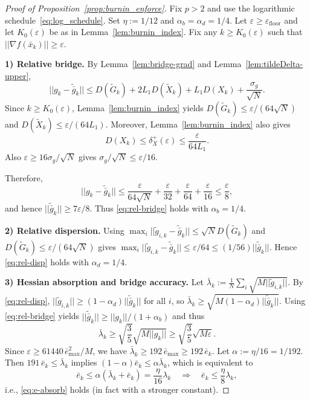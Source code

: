 \documentclass[11pt,a4paper]{article}
\def\norm#1{||#1||}%
\newcommand{\norm}[1]{\left\|#1\right\|}
\begin{document}
	\begin{proof}[Proof of Proposition~\ref{prop:burnin_enforce}]
		Fix $p>2$ and use the logarithmic schedule~\eqref{eq:log_schedule}.
		Set $\eta:=1/12$ and $\alpha_b=\alpha_d=1/4$.
		Let $\varepsilon\ge \varepsilon_{\mathrm{floor}}$ and let $K_0(\varepsilon)$ be as in Lemma~\ref{lem:burnin_index}.
		Fix any $k\ge K_0(\varepsilon)$ such that $\norm{\nabla f(\bar x_k)}\ge \varepsilon$.
		
		\medskip
		\noindent\textbf{1) Relative bridge.}
		By Lemma~\ref{lem:bridge-grad} and Lemma~\ref{lem:tildeDelta-upper},
		\[
		\norm{g_k-\tilde{\bar g}_k}
		\le D(\tilde G_k)+2L_1D(\tilde X_k)+L_1D(X_k)+\frac{\sigma_g}{\sqrt N}.
		\]
		Since $k\ge K_0(\varepsilon)$, Lemma~\ref{lem:burnin_index} yields $D(\tilde G_k)\le \varepsilon/(64\sqrt N)$ and $D(\tilde X_k)\le \varepsilon/(64L_1)$. Moreover, Lemma~\ref{lem:burnin_index} also gives
		\[
		D(X_k)\le \delta_X^{+}(\varepsilon)\le \frac{\varepsilon}{64L_1}.
		\]
		Also $\varepsilon\ge 16\sigma_g/\sqrt N$ gives $\sigma_g/\sqrt N\le \varepsilon/16$.
		
		Therefore,
		\[
		\norm{g_k-\tilde{\bar g}_k}
		\le \frac{\varepsilon}{64\sqrt N}+\frac{\varepsilon}{32}+\frac{\varepsilon}{64}+\frac{\varepsilon}{16}
		\le \frac{\varepsilon}{8},
		\]
		and hence $\norm{\tilde{\bar g}_k}\ge 7\varepsilon/8$. Thus \eqref{eq:rel-bridge} holds with $\alpha_b=1/4$.
		
		\medskip
		\noindent\textbf{2) Relative dispersion.}
		Using $\max_i\norm{\tilde g_{i,k}-\tilde{\bar g}_k}\le \sqrt N D(\tilde G_k)$ and $D(\tilde G_k)\le \varepsilon/(64\sqrt N)$ gives
		$\max_i\norm{\tilde g_{i,k}-\tilde{\bar g}_k}\le \varepsilon/64\le (1/56)\norm{\tilde{\bar g}_k}$.
		Hence \eqref{eq:rel-disp} holds with $\alpha_d=1/4$.
		
		\medskip
		\noindent\textbf{3) Hessian absorption and bridge accuracy.}
		Let $\bar\lambda_k:=\frac1N\sum_i\sqrt{M\norm{\tilde g_{i,k}}}$.
		By \eqref{eq:rel-disp}, $\norm{\tilde g_{i,k}}\ge (1-\alpha_d)\norm{\tilde{\bar g}_k}$ for all $i$, so
		$\bar\lambda_k\ge \sqrt{M(1-\alpha_d)\norm{\tilde{\bar g}_k}}$.
		Using \eqref{eq:rel-bridge} yields $\norm{\tilde{\bar g}_k}\ge \norm{g_k}/(1+\alpha_b)$ and thus
		\[
		\bar\lambda_k\ge \sqrt{\frac{3}{5}}\sqrt{M\norm{g_k}}\ge \sqrt{\frac{3}{5}}\sqrt{M\varepsilon}.
		\]
		Since $\varepsilon\ge 61440\,\bar e_{\max}^2/M$, we have $\bar\lambda_k\ge 192\,\bar e_{\max}\ge 192\,\bar e_k$.
		Let $\alpha:=\eta/16=1/192$. Then $191\,\bar e_k\le \bar\lambda_k$ implies $(1-\alpha)\bar e_k\le \alpha\bar\lambda_k$, which is equivalent to
		\[
		\bar e_k\le \alpha(\bar\lambda_k+\bar e_k)=\frac{\eta}{16}\lambda_k
		\quad\Longrightarrow\quad
		\bar e_k\le \frac{\eta}{8}\lambda_k,
		\]
		i.e., \eqref{eq:e-absorb} holds (in fact with a stronger constant).
		

\end{proof}
\end{document}
